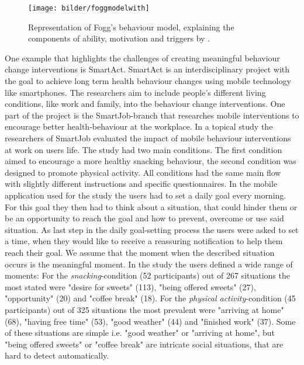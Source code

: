 \documentclass[a4paper]{report}
\begin{document}
\begin{figure}[h]
  \centering
  \texttt{[image: bilder/foggmodelwith]}
  \caption{\label{bmat} Representation of Fogg's behaviour model, explaining the components of ability, motivation and triggers by \cite{Fogg2009}.} 
\end{figure}
One example that highlights the challenges of creating meaningful behaviour change interventions is SmartAct. SmartAct is an interdisciplinary project with the goal to achieve long term health behaviour changes using mobile technology like smartphones. The researchers aim to include people's different living conditions, like work and family, into the behaviour change interventions. One part of the project is the SmartJob-branch that researches mobile interventions to encourage better health-behaviour at the workplace. In a topical study the researchers of SmartJob evaluated the impact of mobile behaviour interventions at work on users life. The study had two main conditions. The first condition aimed to encourage a more healthy snacking behaviour, the second condition was designed to promote physical activity. All conditions had the same main flow with slightly different instructions and specific questionnaires. In the mobile application used for the study the users had to set a daily goal every morning. For this goal they then had to think about a situation, that could hinder them or be an opportunity to reach the goal and how to prevent, overcome or use said situation. As last step in the daily goal-setting process the users were asked to set a time, when they would like to receive a reassuring notification to help them reach their goal. We assume that the moment when the described situation occurs is the meaningful moment. In the study the users defined a wide range of moments:
For the \emph{snacking}-condition (52 participants) out of 267 situations the most stated were "desire for sweets" (113), "being offered sweets" (27), "opportunity" (20) and "coffee break" (18). For the \emph{physical activity}-condition (45 participants) out of 325 situations the most prevalent were "arriving at home" (68), "having free time" (53), "good weather" (44) and  "finished work" (37). Some of these situations are simple i.e. "good weather" or "arriving at home", but "being offered sweets" or "coffee break" are intricate social situations, that are hard to detect automatically.
\end{document}
